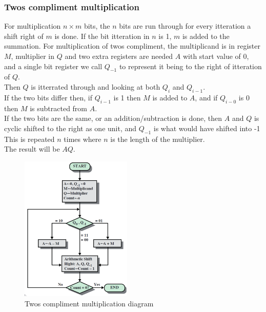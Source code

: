 \documentclass[12pt, a4paper]{article}
\begin{document}
			\subsubsection{Twos compliment multiplication}
				For multiplication $n\times m$ bits, the $n$ bits are run through for every itteration a shift right of $m$ is done. If the bit itteration in $n$ is 1, $m$ is added to the summation.
				For multiplication of twos compliment, the multiplicand is in register $M$, multiplier in $Q$ and two extra registers are needed $A$ with start value of 0, and a single bit register we call $Q_{-1}$ to represent it being to the right of itteration of $Q$.\\
				Then $Q$ is itterrated through and looking at both $Q_i$ and $Q_{i-1}$.\\
				If the two bits differ then, if $Q_{i-1}$ is 1 then $M$ is added to $A$, and if $Q_{i-0}$ is 0 then $M$ is subtracted from $A$.\\
				If the two bits are the same, or an addition/subtraction is done, then $A$ and $Q$ is cyclic shifted to the right as one unit, and $Q_{-1}$ is what would have shifted into -1 \\
				This is repeated $n$ times where $n$ is the length of the multiplier.\\
				The result will be $AQ$.
				\begin{figure}[h!]
					\includegraphics[width=200px]{assets/twosComplimentMultiplication.png}
					\centering
					\caption{Twos compliment multiplication diagram}
				\end{figure}
\end{document}

